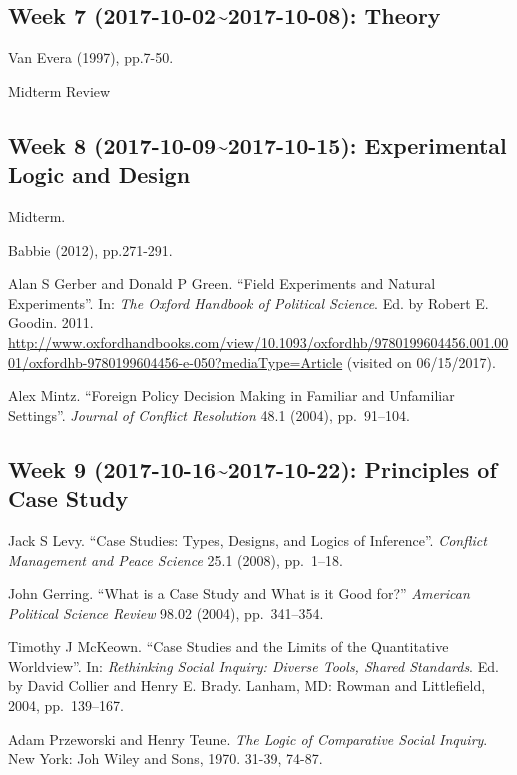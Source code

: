 \documentclass[11pt,]{article}
\begin{document}
\subsection{Week 7 (2017-10-02\textasciitilde{}2017-10-08):
Theory}\label{week-7-2017-10-022017-10-08-theory}

Van Evera (1997), pp.7-50.

Midterm Review

\subsection{Week 8 (2017-10-09\textasciitilde{}2017-10-15): Experimental
Logic and
Design}\label{week-8-2017-10-092017-10-15-experimental-logic-and-design}

Midterm.

Babbie (2012), pp.271-291.

Alan S Gerber and Donald P Green. ``Field Experiments and Natural
Experiments''. In: \emph{The Oxford Handbook of Political Science}. Ed.
by Robert E. Goodin. 2011.
\url{http://www.oxfordhandbooks.com/view/10.1093/oxfordhb/9780199604456.001.0001/oxfordhb-9780199604456-e-050?mediaType=Article}
(visited on 06/15/2017).

Alex Mintz. ``Foreign Policy Decision Making in Familiar and Unfamiliar
Settings''. \emph{Journal of Conflict Resolution} 48.1 (2004),
pp.~91--104.

\subsection{Week 9 (2017-10-16\textasciitilde{}2017-10-22): Principles
of Case
Study}\label{week-9-2017-10-162017-10-22-principles-of-case-study}

Jack S Levy. ``Case Studies: Types, Designs, and Logics of Inference''.
\emph{Conflict Management and Peace Science} 25.1 (2008), pp.~1--18.

John Gerring. ``What is a Case Study and What is it Good for?''
\emph{American Political Science Review} 98.02 (2004), pp.~341--354.

Timothy J McKeown. ``Case Studies and the Limits of the Quantitative
Worldview''. In:
\emph{Rethinking Social Inquiry: Diverse Tools, Shared Standards}. Ed.
by David Collier and Henry E. Brady. Lanham, MD: Rowman and Littlefield,
2004, pp.~139--167.

Adam Przeworski and Henry Teune.
\emph{The Logic of Comparative Social Inquiry}. New York: Joh Wiley and
Sons, 1970. 31-39, 74-87.
\end{document}
